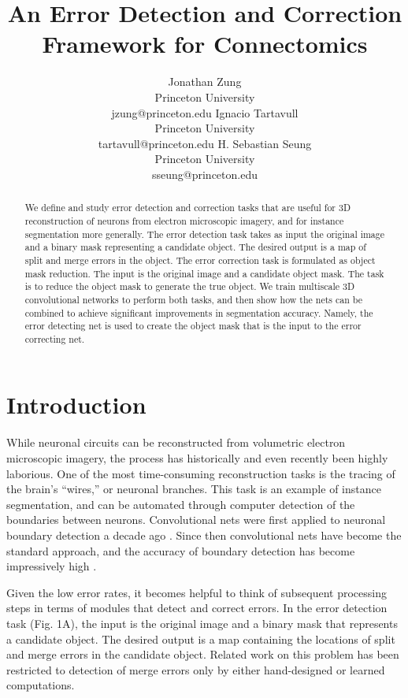 \documentclass{article}
\title{An Error Detection and Correction Framework for Connectomics}
\author{
	Jonathan Zung\\
	Princeton University\\
	jzung@princeton.edu
	\And
	Ignacio Tartavull\\
	Princeton University\\
	tartavull@princeton.edu
	\And
    H. Sebastian Seung\\
	Princeton University\\
	sseung@princeton.edu
}
\begin{document}
\maketitle

\begin{abstract}
We define and study error detection and correction tasks that are
useful for 3D reconstruction of neurons from electron microscopic
imagery, and for instance segmentation more generally.  The error
detection task takes as input the original image and a binary mask
representing a candidate object. The desired output is a map of split
and merge errors in the object. The error correction task is
formulated as object mask reduction. The input is the original image
and a candidate object mask. The task is to reduce the object mask to
generate the true object. We train multiscale 3D convolutional
networks to perform both tasks, and then show how the nets can be
combined to achieve significant improvements in segmentation
accuracy. Namely, the error detecting net is used to create the
object mask that is the input to the error correcting net.
\end{abstract}

\section{Introduction}
While neuronal circuits can be reconstructed from volumetric electron
microscopic imagery, the process has historically
\cite{white1986structure} and even recently \cite{schmidt2017axonal}
been highly laborious. One of the most time-consuming reconstruction
tasks is the tracing of the brain's ``wires,'' or neuronal branches.
This task is an example of instance segmentation, and can be automated through computer detection of the boundaries between neurons. Convolutional nets were first applied to neuronal boundary detection a decade ago \cite{boundary_detection, jain2007supervised}.
Since then convolutional nets have become the standard approach, and
the accuracy of boundary detection has become impressively high  \cite{zeng2017deep, beier2017multicut, kisuk, funke2017deep}.

Given the low error rates, it becomes helpful to think of subsequent processing steps in terms of modules that detect and correct errors. In the error detection task (Fig. 1A), the input is the original image and a binary mask that represents a candidate object. The desired output is a map containing the locations of split and merge errors in the candidate object. Related work on this problem has been restricted to detection of merge errors only by either hand-designed \cite{multipass} or learned \cite{mergenet} computations.
\end{document}
